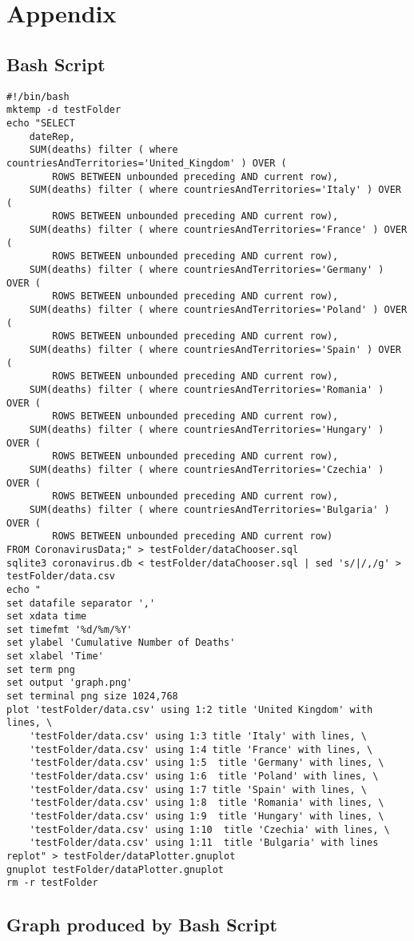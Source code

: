 \documentclass[10pt]{article}
\begin{document}
\newpage
\section{Appendix}
\subsection{Bash Script}
\begin{listing}[H]
    \begin{verbatim}
#!/bin/bash
mktemp -d testFolder
echo "SELECT
    dateRep,
    SUM(deaths) filter ( where countriesAndTerritories='United_Kingdom' ) OVER (
        ROWS BETWEEN unbounded preceding AND current row),
    SUM(deaths) filter ( where countriesAndTerritories='Italy' ) OVER (
        ROWS BETWEEN unbounded preceding AND current row),
    SUM(deaths) filter ( where countriesAndTerritories='France' ) OVER (
        ROWS BETWEEN unbounded preceding AND current row),
    SUM(deaths) filter ( where countriesAndTerritories='Germany' ) OVER (
        ROWS BETWEEN unbounded preceding AND current row),
    SUM(deaths) filter ( where countriesAndTerritories='Poland' ) OVER (
        ROWS BETWEEN unbounded preceding AND current row),
    SUM(deaths) filter ( where countriesAndTerritories='Spain' ) OVER (
        ROWS BETWEEN unbounded preceding AND current row),
    SUM(deaths) filter ( where countriesAndTerritories='Romania' ) OVER (
        ROWS BETWEEN unbounded preceding AND current row),
    SUM(deaths) filter ( where countriesAndTerritories='Hungary' ) OVER (
        ROWS BETWEEN unbounded preceding AND current row),
    SUM(deaths) filter ( where countriesAndTerritories='Czechia' ) OVER (
        ROWS BETWEEN unbounded preceding AND current row),
    SUM(deaths) filter ( where countriesAndTerritories='Bulgaria' ) OVER (
        ROWS BETWEEN unbounded preceding AND current row)
FROM CoronavirusData;" > testFolder/dataChooser.sql
sqlite3 coronavirus.db < testFolder/dataChooser.sql | sed 's/|/,/g' > testFolder/data.csv
echo "
set datafile separator ','
set xdata time
set timefmt '%d/%m/%Y'
set ylabel 'Cumulative Number of Deaths'
set xlabel 'Time'
set term png 
set output 'graph.png'
set terminal png size 1024,768
plot 'testFolder/data.csv' using 1:2 title 'United Kingdom' with lines, \
	'testFolder/data.csv' using 1:3 title 'Italy' with lines, \
	'testFolder/data.csv' using 1:4 title 'France' with lines, \
	'testFolder/data.csv' using 1:5  title 'Germany' with lines, \
	'testFolder/data.csv' using 1:6  title 'Poland' with lines, \
	'testFolder/data.csv' using 1:7 title 'Spain' with lines, \
	'testFolder/data.csv' using 1:8  title 'Romania' with lines, \
	'testFolder/data.csv' using 1:9  title 'Hungary' with lines, \
	'testFolder/data.csv' using 1:10  title 'Czechia' with lines, \
	'testFolder/data.csv' using 1:11  title 'Bulgaria' with lines
replot" > testFolder/dataPlotter.gnuplot
gnuplot testFolder/dataPlotter.gnuplot
rm -r testFolder
    \end{verbatim}
\end{listing}


\newpage
\subsection{Graph produced by Bash Script}
\end{document}
